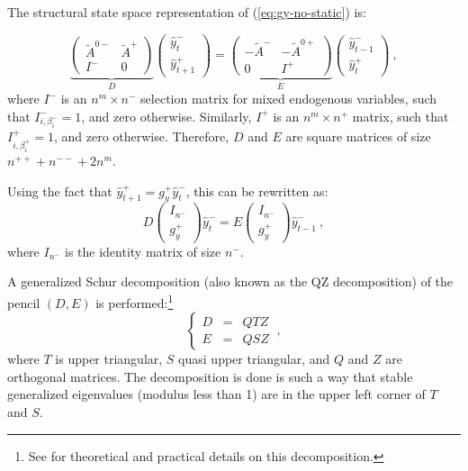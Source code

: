 \documentclass[11pt,a4paper]{article}
\begin{document}
The structural state space representation of (\ref{eq:gy-no-static}) is:

\begin{equation*}
  \underbrace{
    \left(
      \begin{matrix}
        \tilde{A}^{0-} & \tilde{A}^+ \\
        I^- & 0
      \end{matrix}
    \right)
  }_D
  \left(
    \begin{matrix}
      \hat{y}^-_t \\
      \hat{y}^+_{t+1}
    \end{matrix}
  \right)
  =
  \underbrace{
    \left(
      \begin{matrix}
        -\tilde{A}^- & -\tilde{A}^{0+} \\
        0 & I^+
      \end{matrix}
    \right)
  }_E
  \left(
    \begin{matrix}
      \hat{y}^-_{t-1} \\
      \hat{y}^+_t
    \end{matrix}
  \right) \: ,
\end{equation*}
where $I^-$ is an $n^m \times n^-$ selection matrix for mixed endogenous
variables, such that $I^-_{i,\beta^-_i}=1$, and zero otherwise. Similarly,
$I^+$ is an $n^m \times n^+$ matrix, such that $I^+_{i,\beta^+_i}=1$, and zero
otherwise. Therefore, $D$ and $E$ are square matrices of size
$n^{++}+n^{--}+2n^m$.

Using the fact that $\hat{y}^+_{t+1} = g^+_y \hat{y}^-_t$, this can be
rewritten as:
\begin{equation}
  \label{eq:state-space}
  D
  \left(
    \begin{matrix}
      I_{n^-} \\
      g^+_y
    \end{matrix}
  \right)
  \hat{y}^-_t
  =
  E
  \left(
    \begin{matrix}
      I_{n^-} \\
      g^+_y
    \end{matrix}
  \right)
  \hat{y}^-_{t-1} \: ,
\end{equation}
where $I_{n^-}$ is the identity matrix of size $n^-$.

A generalized Schur decomposition (also known as the QZ decomposition) of the
pencil $(D,E)$ is performed:\footnote{See \citet[section
  7.7]{golub/van-loan:1996} for theoretical and practical details on this
  decomposition.}
\begin{equation*}
  \left\{\begin{array}{rcl}
      D & = & QTZ \\
      E & = & QSZ
    \end{array}
  \right. \: ,
\end{equation*}
where $T$ is upper triangular, $S$ quasi upper triangular, and $Q$ and $Z$ are
orthogonal matrices. The decomposition is done is such a way that stable
generalized eigenvalues (modulus less than 1) are in the upper left corner of
$T$ and $S$.
\end{document}
